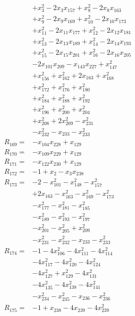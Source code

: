 \begin{align*}
&+x_{3}^{2} -2x_{3}x_{157} +x_{8}^{2} -2x_{8}x_{163}\\
&+x_{9}^{2} -2x_{9}x_{169} +x_{10}^{2} -2x_{10}x_{173}\\
&+x_{11}^{2} -2x_{11}x_{177} +x_{12}^{2} -2x_{12}x_{181}\\
&+x_{13}^{2} -2x_{13}x_{189} +x_{14}^{2} -2x_{14}x_{193}\\
&+x_{15}^{2} -2x_{15}x_{201} +x_{16}^{2} -2x_{16}x_{205}\\
&-2x_{101}x_{209} -x_{143}x_{227} +x_{147}^{2}\\
&+x_{156}^{2} +x_{162}^{2} +2x_{163} +x_{168}^{2}\\
&+x_{172}^{2} +x_{176}^{2} +x_{180}^{2}\\
&+x_{184}^{2} +x_{188}^{2} +x_{192}^{2}\\
&+x_{196}^{2} +x_{200}^{2} +x_{204}^{2}\\
&+x_{208}^{2} +2x_{209}^{2} -x_{231}^{2}\\
&-x_{232}^{2} -x_{233} -x_{233}^{2}\\[3pt]
R_{169}={}&-x_{104}x_{228} +x_{129}\\[3pt]
R_{170}={}&-x_{109}x_{229} +x_{129}\\[3pt]
R_{171}={}&-x_{122}x_{230} +x_{129}\\[3pt]
R_{172}={}&-1 +x_{2} -x_{3}x_{238}\\[3pt]
R_{173}={}&-2 -x_{101}^{2} -x_{148}^{2} -x_{157}^{2}\\
&+2x_{163} -x_{163}^{2} -x_{169}^{2} -x_{173}^{2}\\
&-x_{177}^{2} -x_{181}^{2} -x_{185}^{2}\\
&-x_{189}^{2} -x_{193}^{2} -x_{197}^{2}\\
&-x_{201}^{2} -x_{205}^{2} +x_{209}^{2}\\
&-x_{231}^{2} -x_{232}^{2} -x_{233} -x_{233}^{2}\\[3pt]
R_{174}={}&-1 -4x_{106}^{2} -4x_{111}^{2} -4x_{114}^{2}\\
&-4x_{117}^{2} -4x_{120}^{2} -4x_{124}^{2}\\
&-4x_{127}^{2} +x_{129}^{2} -4x_{131}^{2}\\
&-4x_{135}^{2} -4x_{138}^{2} -4x_{141}^{2}\\
&-x_{234}^{2} -x_{235}^{2} -x_{236} -x_{236}^{2}\\[3pt]
R_{175}={}&-1 +x_{238} -4x_{239} -4x_{239}^{2}\\[3pt]
\end{align*}
